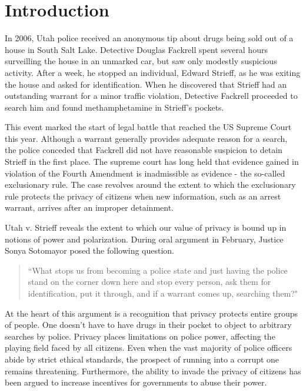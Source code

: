 %

\section{Introduction}
\label{sec:intro}




In 2006, Utah police received an anonymous tip about drugs being sold out of a house in South Salt Lake. Detective Douglas Fackrell spent several hours surveilling the house in an unmarked car, but saw only modestly suspicious activity.  After a week, he stopped an individual, Edward Strieff, as he was exiting the house and asked for identification.  When he discovered that Strieff had an outstanding warrant for a minor traffic violation, Detective Fackrell proceeded to search him and found methamphetamine in Strieff's pockets.  

This event marked the start of legal battle that reached the US Supreme Court this year.  Although a warrant generally provides adequate reason for a search, the police conceded that Fackrell did not have reasonable suspicion to detain Strieff in the first place.  The supreme court has long held that evidence gained in violation of the Fourth Amendment is inadmissible as evidence - the so-called exclusionary rule.  The case revolves around the extent to which the exclusionary rule protects the privacy of citizens when new information, such as an arrest warrant, arrives after an improper detainment.

Utah v. Strieff reveals the extent to which our value of privacy is bound up in notions of power and polarization.  During oral argument in February, Justice Sonya Sotomayor posed the following question. 

\begin{quote}``What stops us from becoming a police state and just having the police stand on the corner down here and stop every person, ask them for identification, put it through, and if a warrant comes up, searching them?"
\end{quote}

At the heart of this argument is a recognition that privacy protects entire groups of people.  One doesn't have to have drugs in their pocket to object to arbitrary searches by police.  Privacy places limitations on police power, affecting the playing field faced by all citizens.  Even when the vast majority of police officers abide by strict ethical standards, the prospect of running into a corrupt one remains threatening.  Furthermore, the ability to invade the privacy of citizens has been argued to increase incentives for governments to abuse their power. 


